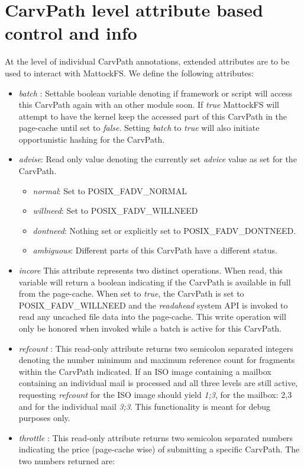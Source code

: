\section{CarvPath level attribute based control and info}
At the level of individual CarvPath annotations, extended attributes are to be used to interact with MattockFS. We define the following attributes:
\begin{itemize}
\item \emph{batch} : Settable boolean variable denoting if framework or script will access this CarvPath again with an other module soon. If \emph{true} MattockFS will attempt to have the kernel keep the accessed part of this CarvPath in the page-cache until set to \emph{false}. Setting \emph{batch} to \emph{true} will also initiate opportunistic hashing for the CarvPath.
\item \emph{advise}: Read only value denoting the currently set \emph{advice} value as set for the CarvPath.
\begin{itemize}
\item \emph{normal}: Set to POSIX\_FADV\_NORMAL
\item \emph{willneed}: Set to  POSIX\_FADV\_WILLNEED
\item \emph{dontneed}: Nothing set or explicitly set to POSIX\_FADV\_DONTNEED.
\item \emph{ambiguous}: Different parts of this CarvPath have a different status.
\end{itemize} 
\item \emph{incore} This attribute represents two distinct operations. When read, this variable will return a boolean indicating if the CarvPath is available in full from the page-cache. When set to \emph{true}, the CarvPath is set to POSIX\_FADV\_WILLNEED and the \emph{readahead} system API is invoked to read any uncached file data into the page-cache. This write operation will only be honored when invoked while a batch is active for this CarvPath. 
\item \emph{refcount} : This read-only attribute returns two semicolon separated integers denoting the number minimum and maximum reference count for fragments within the CarvPath indicated. If an ISO image containing a mailbox containing an individual mail is processed and all three levels are still active, requesting \emph{refcount} for the ISO image should yield \emph{1;3}, for the mailbox: {2,3} and for the individual mail \emph{3;3}. This functionality is meant for debug purposes only. 
\item \emph{throttle} : This read-only attribute returns two semicolon separated numbers indicating the price (page-cache wise) of submitting a specific CarvPath. The two numbers returned are:

\end{itemize}
